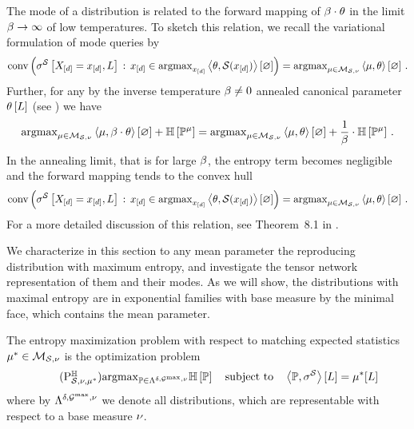 The mode of a distribution is related to the forward mapping of $\beta\cdot\theta$ in the limit $\beta\rightarrow\infty$ of low temperatures.
To sketch this relation, we recall the variational formulation of mode queries by
\begin{align*}
    \mathrm{conv}\left(\sigma^{\mathcal{S}}\left[X_{[d]}=x_{[d]},L\right] \, : \, x_{[d]}\in\mathrm{argmax}_{x_{[d]}}\left\langle \theta,\mathcal{S}(x_{[d]})\right\rangle \left[ \varnothing \right]\right)
    = \mathrm{argmax}_{\mu\in\mathcal{M}_{\mathcal{S},\nu}} \left\langle \mu,\theta\right\rangle \left[ \varnothing \right]  \, .
\end{align*}
Further, for any by the inverse temperature $\beta\neq0$ annealed canonical parameter $\theta\left[L\right]$ (see ) we have
\begin{align*}
    \mathrm{argmax}_{\mu\in\mathcal{M}_{\mathcal{S},\nu}}  \left\langle \mu,\beta\cdot\theta\right\rangle \left[ \varnothing \right]+ \mathbb{H}\left[\mathbb{P}^{\mu}\right]
    = \mathrm{argmax}_{\mu\in\mathcal{M}_{\mathcal{S},\nu}}  \left\langle \mu,\theta\right\rangle \left[ \varnothing \right] + \frac{1}{\beta} \cdot \mathbb{H}\left[\mathbb{P}^{\mu}\right] \, .
\end{align*}
In the annealing limit, that is for large $\beta$, the entropy term becomes negligible and the forward mapping tends to the convex hull
\begin{align*}
    \mathrm{conv}\left(\sigma^{\mathcal{S}}\left[X_{[d]}=x_{[d]},L\right] \, : \, x_{[d]}\in\mathrm{argmax}_{x_{[d]}}\left\langle \theta,\mathcal{S}(x_{[d]})\right\rangle \left[ \varnothing \right]\right)
    = \mathrm{argmax}_{\mu\in\mathcal{M}_{\mathcal{S},\nu}} \left\langle \mu,\theta\right\rangle \left[ \varnothing \right]  \, .
\end{align*}
For a more detailed discussion of this relation, see Theorem~8.1 in \cite{wainwright_graphical_2008}.



We characterize in this section to any mean parameter the reproducing distribution with maximum entropy, and investigate the tensor network representation of them and their modes.
As we will show, the distributions with maximal entropy are in exponential families with base measure by the minimal face, which contains the mean parameter.

\label{sec:maxEntProblem}


The entropy maximization problem with respect to matching expected statistics $\mu^*\in\mathcal{M}_{\mathcal{S},\nu}$ is the optimization problem
\begin{align}
    \label{prob:maxEntropy}\tag{$\probtagtypeinst{\entropysymbol}{\sstat,\basemeasure,\genmean}$}%
    \argmax_{\probtensor\in\bmrealprobof{\basemeasure}} \sentropyof{\probtensor} \stspace
    \contractionof{\probtensor,\sencsstat}{\selvariable} = \genmeanat{\selvariable}
\end{align}
where by $\Lambda^{\delta,\mathcal{G}^{\mathrm{max}},\nu}$ we denote all distributions, which are representable with respect to a base measure $\nu$.

